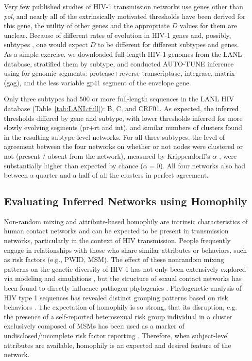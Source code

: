 \documentclass[utf8]{FrontiersinHarvard} %
\begin{document}
Very few published studies of HIV-1 transmission networks use genes other than
	{\it pol}, and nearly all of the extrinsically motivated thresholds have been
derived for this gene, the utility of other genes and the appropriate $D$
values for them are unclear. Because of different rates of evolution in HIV-1
genes and, possibly, subtypes \cite{Penn:2008aa}, one would expect $D$ to be
different for different subtypes and genes. As a simple exercise, we downloaded
full-length HIV-1 genomes from the LANL database, stratified them by subtype,
and conducted AUTO-TUNE inference using for genomic segments: protease+reverse
transcriptase, integrase, matrix (gag), and the less variable gp41 segment of
the envelope gene.

Only three subtypes had $500$ or more full-length sequences in the LANL HIV
database (Table~\ref{tab:LANL:full}): B, C, and CRF01. As expected, the
inferred thresholds differed by gene and subtype, with lower thresholds
inferred for more slowly evolving segments (pr+rt and int), and similar numbers
of clusters found in the resulting subtype-level networks. For all three
subtypes, the level of agreement between the four networks on whether or not
nodes were clustered or not (present / absent from the network), measured by
Krippendorff's $\alpha$ \cite{doi:10.1080/19312450709336664}, were
substantially higher than expected by chance ($\alpha = 0$). All four networks
also had between a quarter and a half of all the clusters in perfect agreement. 

\subsection{Evaluating Inferred Networks using Homophily}

Non-random mixing and attribute-based homophily are intrinsic characteristics
of human contact networks and can be expected to be present in transmission
networks, particularly in the context of HIV transmission. People frequently
engage in relationships with those who share similar attributes or behaviors,
such as risk factors (e.g., PWID, MSM). The effect of these nonrandom mixing
patterns on the genetic diversity of HIV-1 has not only been extensively
explored via modeling and simulations \citep{goodreau_assessing_2006}, but the
structure of sexual contact networks has been found to directly influence
pathogen phylogenies \citep{robinson_how_2013}. Phylogenetic analysis of HIV
type 1 sequences has revealed distinct grouping patterns based on risk
behaviors \citep{holmes_molecular_1995}. The expectation of homophily is so
strong, that its disruption, e.g. the presence of a self-reported heterosexual
risk group individual in a cluster exclusively composed of MSMs has been used
as a marker of undisclosed/incomplete risk factor reporting
\cite{Ragonnet-Cronin:2018aa}. Therefore, when subject-level attributes are
available, homophily is an expected and desired feature of the network.
\end{document}
